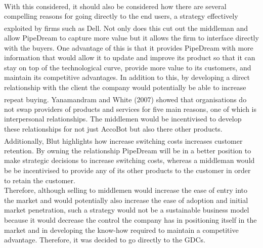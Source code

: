 \documentclass[11pt]{article}		%
\newcommand{\supercite}[1]{\textsuperscript{\cite{#1}}}		%
\begin{document}
    \\
    \hspace*{2ex}With this considered, it should also be considered how there are several compelling reasons for going directly to the end users, a strategy effectively exploited by firms such as Dell\supercite{business_model}. Not only does this cut out the middleman and allow PipeDream to capture more value but it allows the firm to interface directly with the buyers. One advantage of this is that it provides PipeDream with more information that would allow it to update and improve its product so that it can stay on top of the technological curve, provide more value to its customers, and maintain its competitive advantages. In addition to this, by developing a direct relationship with the client the company would potentially be able to increase repeat buying. Yanamandram and White (2007)\supercite{customers} showed that organisations do not swap providers of products and services for five main reasons, one of which is interpersonal relationships. The middlemen would be incentivised to develop these relationships for not just AccoBot but also there other products. Additionally, Blut\supercite{B2Brelations} highlights how increase switching costs increases customer retention. By owning the relationship PipeDream will be in a better position to make strategic decisions to increase switching costs, whereas a middleman would be be incentivised to provide any of its other products to the customer in order to retain the customer. 
    \\
    \hspace*{2ex}Therefore, although selling to middlemen would increase the ease of entry into the market and would potentially also increase the ease of adoption and initial market penetration, such a strategy would not be a sustainable business model because it would decrease the control the company has in positioning itself in the market and in developing the know-how required to maintain a competitive advantage. Therefore, it was decided to go directly to the GDCs.
\end{document}
